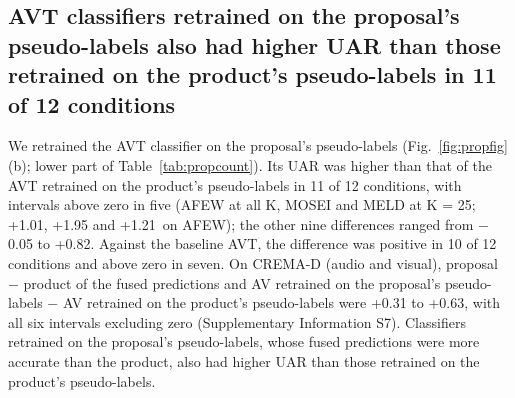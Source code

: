 \subsection{AVT classifiers retrained on the proposal's pseudo-labels also had higher UAR than those retrained on the product's pseudo-labels in 11 of 12 conditions}\label{sec:res-retrain}
We retrained the AVT classifier on the proposal's pseudo-labels (Fig.~\ref{fig:propfig}(b); lower part of Table~\ref{tab:propcount}). Its UAR was higher than that of the AVT retrained on the product's pseudo-labels in 11 of 12 conditions, with intervals above zero in five (AFEW at all K, MOSEI and MELD at K = 25; +1.01, +1.95 and +1.21\pt\ on AFEW); the other nine differences ranged from $-$0.05 to +0.82\pt. Against the baseline AVT, the difference was positive in 10 of 12 conditions and above zero in seven. On CREMA-D (audio and visual), proposal $-$ product of the fused predictions and AV retrained on the proposal's pseudo-labels $-$ AV retrained on the product's pseudo-labels were +0.31 to +0.63\pt, with all six intervals excluding zero (Supplementary Information S7). Classifiers retrained on the proposal's pseudo-labels, whose fused predictions were more accurate than the product, also had higher UAR than those retrained on the product's pseudo-labels.
